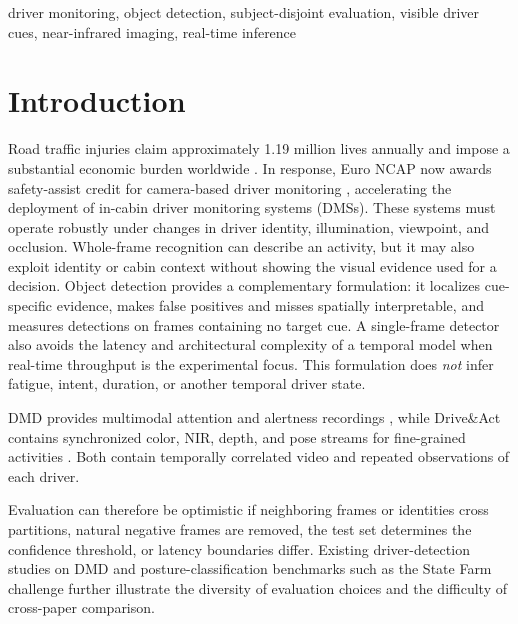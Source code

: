 \documentclass[conference]{IEEEtran}
\begin{document}
\begin{IEEEkeywords}
driver monitoring, object detection, subject-disjoint evaluation, visible driver cues, near-infrared imaging, real-time inference
\end{IEEEkeywords}

\section{Introduction}
Road traffic injuries claim approximately 1.19 million lives annually and impose a substantial economic burden worldwide \cite{who2023roadsafety}. In response, Euro NCAP now awards safety-assist credit for camera-based driver monitoring \cite{euroncap2025dms}, accelerating the deployment of in-cabin driver monitoring systems (DMSs). These systems must operate robustly under changes in driver identity, illumination, viewpoint, and occlusion. Whole-frame recognition can describe an activity, but it may also exploit identity or cabin context without showing the visual evidence used for a decision. Object detection provides a complementary formulation: it localizes cue-specific evidence, makes false positives and misses spatially interpretable, and measures detections on frames containing no target cue. A single-frame detector also avoids the latency and architectural complexity of a temporal model when real-time throughput is the experimental focus. This formulation does \emph{not} infer fatigue, intent, duration, or another temporal driver state. 

DMD provides multimodal attention and alertness recordings \cite{ortega2020dmd}, while Drive\&Act contains synchronized color, NIR, depth, and pose streams for fine-grained activities \cite{martin2019driveact}. Both contain temporally correlated video and repeated observations of each driver.

Evaluation can therefore be optimistic if neighboring frames or identities cross partitions, natural negative frames are removed, the test set determines the confidence threshold, or latency boundaries differ. Existing driver-detection studies on DMD \cite{jain2024dmd} and posture-classification benchmarks such as the State Farm challenge \cite{abouelnaga2018sfdd} further illustrate the diversity of evaluation choices and the difficulty of cross-paper comparison.
\end{document}
